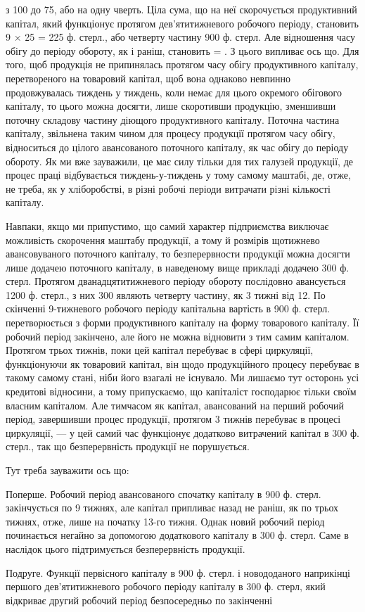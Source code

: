 \parcont{}  %
з 100 до 75, або на одну чверть. Ціла сума, що на неї скорочується
продуктивний капітал, який функціонує протягом дев’ятитижневого робочого
періоду, становить 9 × 25 = 225 ф. стерл., або четверту частину
900 ф. стерл. Але відношення часу обігу до періоду обороту, як і раніш,
становить  = . З цього випливає ось що. Для того, щоб продукція
не припинялась протягом часу обігу продуктивного капіталу, перетвореного
на товаровий капітал, щоб вона однаково невпинно продовжувалась тиждень
у тиждень, коли немає для цього окремого обігового капіталу, то
цього можна досягти, лише скоротивши продукцію, зменшивши поточну
складову частину діющого продуктивного капіталу. Поточна частина капіталу,
звільнена таким чином для процесу продукції протягом часу обігу,
відноситься до цілого авансованого поточного капіталу, як час обігу до
періоду обороту. Як ми вже зауважили, це має силу тільки для тих галузей
продукції, де процес праці відбувається тиждень-у-тиждень у
тому самому маштабі, де, отже, не треба, як у хліборобстві, в різні робочі
періоди витрачати різні кількості капіталу.

Навпаки, якщо ми припустимо, що самий характер підприємства виключає
можливість скорочення маштабу продукції, а тому й розмірів щотижнево
авансовуваного поточного капіталу, то безперервности продукції
можна досягти лише додачею поточного капіталу, в наведеному вище
прикладі додачею 300 ф. стерл. Протягом дванадцятитижневого періоду
обороту послідовно авансується 1200 ф. стерл., з них 300 являють четверту
частину, як 3 тижні від 12. По скінченні 9-тижневого робочого
періоду капітальна вартість в 900 ф. стерл. перетворюється з форми
продуктивного капіталу на форму товарового капіталу. Її робочий період
закінчено, але його не можна відновити з тим самим капіталом. Протягом
трьох тижнів, поки цей капітал перебуває в сфері циркуляції, функціонуючи
як товаровий капітал, він щодо продукційного процесу перебуває
в такому самому стані, ніби його взагалі не існувало. Ми лишаємо тут
осторонь усі кредитові відносини, а тому припускаємо, що капіталіст
господарює тільки своїм власним капіталом. Але тимчасом як капітал,
авансований на перший робочий період, завершивши процес продукції,
протягом 3 тижнів перебуває в процесі циркуляції, — у цей самий час
функціонує додатково витрачений капітал в 300 ф. стерл., так що безперервність
продукції не порушується.

Тут треба зауважити ось що:

Поперше. Робочий період авансованого спочатку капіталу в 900 ф.
стерл. закінчується по 9 тижнях, але капітал припливає назад не раніш,
як по трьох тижнях, отже, лише на початку 13-го тижня. Однак новий
робочий період починається негайно за допомогою додаткового капіталу
в 300 ф. стерл. Саме в наслідок цього підтримується безперервність
продукції.

Подруге. Функції первісного капіталу в 900 ф. стерл. і новододаного
наприкінці першого дев’ятитижневого робочого періоду капіталу в 300 ф.
стерл, який відкриває другий робочий період безпосередньо по закінченні
\parbreak{}  %
